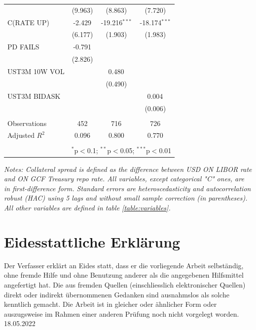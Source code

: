 \documentclass[11pt,a4paper,english,oneside]{article}
\begin{document}
\begin{appendices}
\begin{table}[!htbp]
\begin{tabular}{@{\extracolsep{5pt}}lccc}
  & (9.963) & (8.863) & (7.720) \\
 C(RATE UP) & -2.429$^{}$ & -19.216$^{***}$ & -18.174$^{***}$ \\
  & (6.177) & (1.903) & (1.983) \\
 PD FAILS & -0.791$^{}$ & & \\
  & (2.826) & & \\
 UST3M 10W VOL & & 0.480$^{}$ & \\
  & & (0.490) & \\
 UST3M BIDASK & & & 0.004$^{}$ \\
  & & & (0.006) \\
\hline \\[-1.8ex]
 Observations & 452 & 716 & 726 \\
 Adjusted $R^2$ & 0.096 & 0.800 & 0.770 \\
\hline
\hline \\[-1.8ex]
 & \multicolumn{3}{r}{$^{*}$p$<$0.1; $^{**}$p$<$0.05; $^{***}$p$<$0.01} \\
\end{tabular}
\begin{flushleft}
\vspace{-5pt}
  \textit{Notes: Collateral spread is defined as the difference between USD ON LIBOR rate and ON GCF Treasury repo rate. All variables, except categorical "C" ones, are in first-difference form. Standard errors are heteroscedasticity and autocorrelation robust (HAC) using 5 lags and without small sample correction (in parentheses). All other variables are defined in table \ref{table:variables}.}
\end{flushleft}
\label{table:reg3}
\end{table}

\end{appendices}

\newpage


\newpage
\thispagestyle{firststyle}
\section*{Eidesstattliche Erklärung}
Der Verfasser erklärt an Eides statt, dass er die vorliegende Arbeit selbständig, ohne fremde Hilfe und ohne Benutzung anderer als die angegebenen Hilfsmittel angefertigt hat. Die aus fremden Quellen (einschliesslich elektronischer Quellen) direkt oder indirekt übernommenen Gedanken sind ausnahmslos als solche kenntlich gemacht. Die Arbeit ist in gleicher oder ähnlicher Form oder auszugsweise im Rahmen einer anderen Prüfung noch nicht vorgelegt worden.\\[2cm]

\hspace{60pt} 18.05.2022

 \hfill {}
\end{document}
